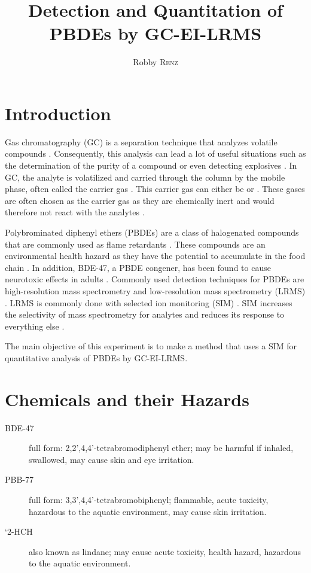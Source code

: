 \documentclass[a4paper, 12pt]{article}
\title{Detection and Quantitation of PBDEs by GC-EI-LRMS}
\author{Robby \textsc{Renz}}
\begin{document}
\maketitle

\section{Introduction}
Gas chromatography (GC) is a separation technique that analyzes volatile compounds \cite{vitha_chromatography:_2017}. Consequently, this analysis can lead a lot of useful situations such as the determination of the purity of a compound or even detecting explosives \cite{vitha_chromatography:_2017}. In GC, the analyte is volatilized and carried through the column by the mobile phase, often called the carrier gas \cite{harris}. This carrier gas can either be  or  \cite{harris}. These gases are often chosen as the carrier gas as they are chemically inert and would therefore not react with the analytes \cite{vitha_chromatography:_2017}.

Polybrominated diphenyl ethers (PBDEs) are a class of halogenated compounds that are commonly used as flame retardants \cite{bjorklund_mass_2003}. These compounds are an environmental health hazard as they have the potential to accumulate in the food chain \cite{thomsen_comparing_2002}. In addition, BDE-47, a PBDE congener, has been found to cause neurotoxic effects in adults \cite{thomsen_comparing_2002}. Commonly used detection techniques for PBDEs are high-resolution mass spectrometry and low-resolution mass spectrometry (LRMS) \cite{bjorklund_mass_2003}. LRMS is commonly done with selected ion monitoring (SIM) \cite{bjorklund_mass_2003}. SIM increases the selectivity of mass spectrometry for analytes and reduces its response to everything else \cite{harris}.

The main objective of this experiment is to make a method that uses a SIM for quantitative analysis of PBDEs by GC-EI-LRMS.

\section{Chemicals and their Hazards}

\begin{description}
	\item[BDE-47] full form: 2,2',4,4'-tetrabromodiphenyl ether; may be harmful if inhaled, swallowed, may cause skin and eye irritation.
	\item[PBB-77] full form: 3,3',4,4'-tetrabromobiphenyl; flammable, acute toxicity, hazardous to the aquatic environment, may cause skin irritation.
	\item[`2-HCH] also known as lindane; may cause acute toxicity, health hazard, hazardous to the aquatic environment.
\end{description}

\printbibliography
\end{document}
